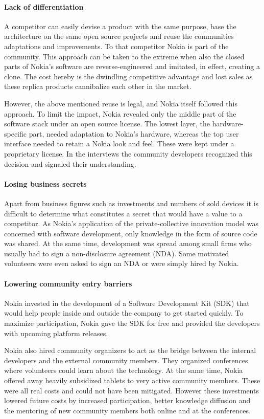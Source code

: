 \documentclass[a4paper]{scrartcl}
\begin{document}
\paragraph{Lack of differentiation}
A competitor can easily devise a product with the same purpose, base the architecture on the same open source projects and reuse the communities adaptations and improvements.
To that competitor Nokia is part of the community. 
This approach can be taken to the extreme when also the closed parts of Nokia's software are reverse-engineered and imitated, in effect, creating a clone.
The cost hereby is the dwindling competitive advantage and lost sales as these replica products cannibalize each other in the market.

However, the above mentioned reuse is legal, and Nokia itself followed this approach.
To limit the impact, Nokia revealed only the middle part of the software stack under an open source license.
The lowest layer, the hardware-specific part, needed adaptation to Nokia's hardware, whereas the top user interface needed to retain a Nokia look and feel. 
These were kept under a proprietary license.
In the interviews the community developers recognized this decision and signaled their understanding.

\paragraph{Losing business secrets}
Apart from business figures such as investments and numbers of sold devices it is difficult to determine what constitutes a secret that would have a value to a competitor.
As Nokia's application of the private-collective innovation model was concerned with software development, only knowledge in the form of source code was shared.
At the same time, development was spread among small firms who usually had to sign a non-disclosure agreement (NDA).
Some motivated volunteers were even asked to sign an NDA or were simply hired by Nokia.

\paragraph{Lowering community entry barriers}
Nokia invested in the development of a Software Development Kit (SDK) that would help people inside and outside the company to get started quickly. 
To maximize participation, Nokia gave the SDK for free and provided the developers with upcoming platform releases.

Nokia also hired community organizers to act as the bridge between the internal developers and the external community members. 
They organized conferences where volunteers could learn about the technology.
At the same time, Nokia offered away heavily subsidized tablets to very active community members.
These were all real costs and could not have been mitigated. 
However these investments lowered future costs by increased participation, better knowledge diffusion and the mentoring of new community members both online and at the conferences.
\end{document}
